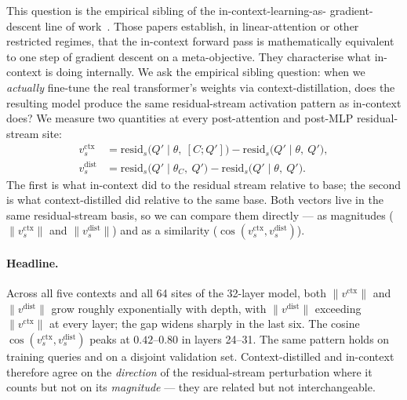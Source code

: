\documentclass[letterpaper]{article} %
\begin{document}
This question is the empirical sibling of the in-context-learning-as-
gradient-descent line of work~\citep{vonoswald2023transformers,
akyurek2023learning, garg2022what}. Those papers establish, in
linear-attention or other restricted regimes, that the in-context
forward pass is mathematically equivalent to one step of gradient
descent on a meta-objective. They characterise what in-context is
doing internally. We ask the empirical sibling question: when we
\emph{actually} fine-tune the real transformer's weights via
context-distillation, does the resulting model produce the same
residual-stream activation pattern as in-context does? We measure two
quantities at every post-attention and post-MLP residual-stream site:
\begin{align*}
v^\text{ctx}_s &= \mathrm{resid}_s\bigl(Q' \mid \theta,\ [C; Q']\bigr) -
                  \mathrm{resid}_s\bigl(Q' \mid \theta,\ Q'\bigr), \\
v^\text{dist}_s  &= \mathrm{resid}_s\bigl(Q' \mid \theta_C,\ Q'\bigr) -
                  \mathrm{resid}_s\bigl(Q' \mid \theta,\ Q'\bigr).
\end{align*}
The first is what in-context did to the residual stream relative to
base; the second is what context-distilled did relative to the same
base. Both vectors live in the same residual-stream basis, so we can
compare them directly --- as magnitudes ($\|v^\text{ctx}_s\|$ and
$\|v^\text{dist}_s\|$) and as a similarity
($\cos(v^\text{ctx}_s, v^\text{dist}_s)$).

\paragraph{Headline.}
Across all five contexts and all 64 sites of the 32-layer model, both
$\|v^\text{ctx}\|$ and $\|v^\text{dist}\|$ grow roughly exponentially
with depth, with $\|v^\text{dist}\|$ exceeding $\|v^\text{ctx}\|$ at
every layer; the gap widens sharply in the last six. The cosine
$\cos(v^\text{ctx}_s, v^\text{dist}_s)$ peaks at $0.42$--$0.80$ in
layers 24--31. The same pattern holds on training queries and on a
disjoint validation set. Context-distilled and in-context therefore
agree on the \emph{direction} of the residual-stream perturbation
where it counts but not on its \emph{magnitude} --- they are related
but not interchangeable.
\end{document}
